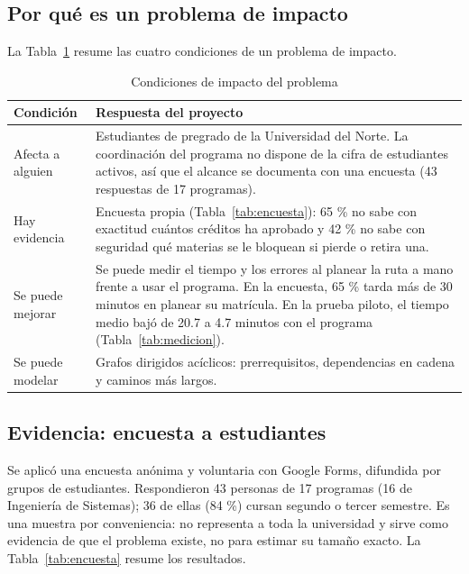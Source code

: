 \documentclass[11pt,a4paper]{article}
\begin{document}
\subsection{Por qué es un problema de impacto}
La Tabla~\ref{tab:impacto} resume las cuatro condiciones de un problema de impacto.

\begin{table}[htbp]
\centering
\caption{Condiciones de impacto del problema}
\label{tab:impacto}
\begin{tabular}{p{3.3cm}p{11.2cm}}
\toprule
Condición & Respuesta del proyecto \\
\midrule
Afecta a alguien & Estudiantes de pregrado de la Universidad del Norte. La coordinación del programa no dispone de la cifra de estudiantes activos, así que el alcance se documenta con una encuesta (43 respuestas de 17 programas). \\
Hay evidencia & Encuesta propia (Tabla~\ref{tab:encuesta}): 65 \% no sabe con exactitud cuántos créditos ha aprobado y 42 \% no sabe con seguridad qué materias se le bloquean si pierde o retira una. \\
Se puede mejorar & Se puede medir el tiempo y los errores al planear la ruta a mano frente a usar el programa. En la encuesta, 65 \% tarda más de 30 minutos en planear su matrícula. En la prueba piloto, el tiempo medio bajó de 20.7 a 4.7 minutos con el programa (Tabla~\ref{tab:medicion}). \\
Se puede modelar & Grafos dirigidos acíclicos: prerrequisitos, dependencias en cadena y caminos más largos. \\
\bottomrule
\end{tabular}
\end{table}

\subsection{Evidencia: encuesta a estudiantes}
Se aplicó una encuesta anónima y voluntaria con Google Forms, difundida por grupos de estudiantes. Respondieron 43 personas de 17 programas (16 de Ingeniería de Sistemas); 36 de ellas (84 \%) cursan segundo o tercer semestre. Es una muestra por conveniencia: no representa a toda la universidad y sirve como evidencia de que el problema existe, no para estimar su tamaño exacto. La Tabla~\ref{tab:encuesta} resume los resultados.
\end{document}
